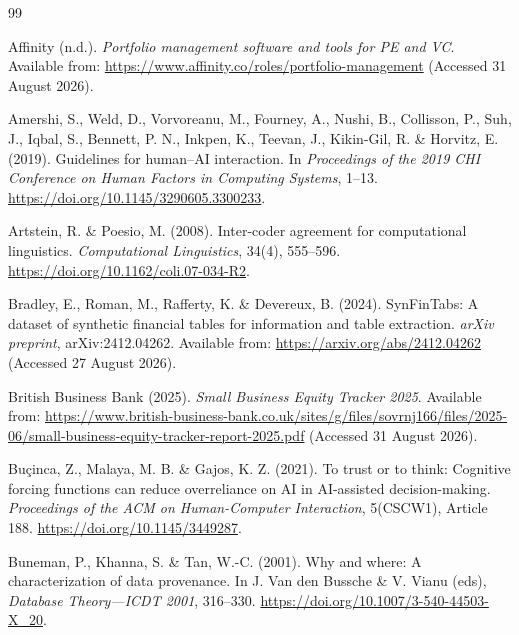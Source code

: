 \begin{thebibliography}{99}

Affinity (n.d.).
\emph{Portfolio management software and tools for PE and VC}.
Available from: \url{https://www.affinity.co/roles/portfolio-management}
(Accessed 31 August 2026).

Amershi, S., Weld, D., Vorvoreanu, M., Fourney, A., Nushi, B., Collisson, P., Suh, J., Iqbal, S.,
Bennett, P. N., Inkpen, K., Teevan, J., Kikin-Gil, R. \& Horvitz, E. (2019).
Guidelines for human--AI interaction.
In \emph{Proceedings of the 2019 CHI Conference on Human Factors in Computing Systems}, 1--13.
\url{https://doi.org/10.1145/3290605.3300233}.

Artstein, R. \& Poesio, M. (2008).
Inter-coder agreement for computational linguistics.
\emph{Computational Linguistics}, 34(4), 555--596.
\url{https://doi.org/10.1162/coli.07-034-R2}.

Bradley, E., Roman, M., Rafferty, K. \& Devereux, B. (2024).
SynFinTabs: A dataset of synthetic financial tables for information and table extraction.
\emph{arXiv preprint}, arXiv:2412.04262.
Available from: \url{https://arxiv.org/abs/2412.04262} (Accessed 27 August 2026).

British Business Bank (2025).
\emph{Small Business Equity Tracker 2025}.
Available from:
\url{https://www.british-business-bank.co.uk/sites/g/files/sovrnj166/files/2025-06/small-business-equity-tracker-report-2025.pdf}
(Accessed 31 August 2026).

Bu\c{c}inca, Z., Malaya, M. B. \& Gajos, K. Z. (2021).
To trust or to think: Cognitive forcing functions can reduce overreliance on AI in AI-assisted
decision-making. \emph{Proceedings of the ACM on Human-Computer Interaction}, 5(CSCW1), Article
188. \url{https://doi.org/10.1145/3449287}.

Buneman, P., Khanna, S. \& Tan, W.-C. (2001).
Why and where: A characterization of data provenance.
In J. Van den Bussche \& V. Vianu (eds), \emph{Database Theory---ICDT 2001}, 316--330.
\url{https://doi.org/10.1007/3-540-44503-X_20}.


\end{thebibliography}
